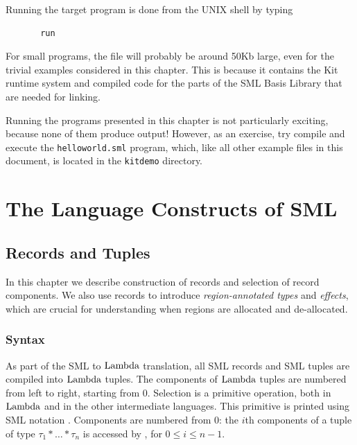 \documentclass[12pt]{book}
\begin{document}
Running the target program is done from the UNIX shell by typing
%
\begin{verbatim}
       run
\end{verbatim}
For small programs, the file will probably be around 50Kb large, even
for the trivial examples considered in this chapter.  This is because
it contains the Kit runtime system and compiled code for the parts of
the SML Basis Library that are needed for linking.

Running the programs presented in this chapter is not particularly
exciting, because none of them produce output! However, as an
exercise, try compile and execute the 
%
{\tt helloworld.sml} program, which, like all other example files in
this document, is located in the
%
{\tt kitdemo} directory.


\part{The Language Constructs of SML}
\label{understanding.sec}

\chapter{Records and Tuples}
\label{records.sec}
In this chapter we describe construction of 
%
records and selection of record components. We also use records to
introduce 
%
{\em region-annotated types} and 
%
{\em effects}, which are crucial for understanding when regions are
allocated and de-allocated.

\section{Syntax}
As part of the SML to 
%
$\hbox{\rm Lambda}$ translation, all SML records and SML tuples are compiled into
$\hbox{\rm Lambda}$ tuples. The components of $\hbox{\rm Lambda}$ tuples are numbered from left
to right, starting from 0.  Selection is a primitive operation, both
in $\hbox{\rm Lambda}$ and in the other intermediate languages. This primitive is
printed using SML notation . Components are numbered from
0: the $i$th components of a tuple of type
$\tau_1\ast\ldots\ast\tau_n$ is accessed by , for $0\leq
i\leq n-1$.
\end{document}
